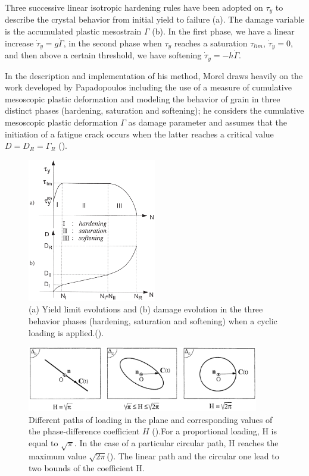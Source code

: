 Three successive linear isotropic hardening rules have
been adopted on $\tau_y$ to describe the crystal behavior from
initial yield to failure (a). The damage variable is the accumulated plastic mesostrain $\Gamma$ (b).
In the first phase, we have a linear increase $\dot{\tau}_y=g\dot{\Gamma}$, in the second phase when $\tau_y$ reaches a saturation $\tau_{lim}$, $\dot{\tau}_y=0$, and then above a certain threshold, we have softening $\dot{\tau}_y=-h\dot{\Gamma}$.

In the description and implementation of his method, Morel draws heavily on the work developed by Papadopoulos including the use of a measure of cumulative mesoscopic plastic deformation   and modeling the behavior of grain in three distinct phases (hardening, saturation and softening); he considers the cumulative mesoscopic plastic deformation $\Gamma$ as damage parameter and assumes that the initiation of a fatigue crack occurs when the latter reaches a
critical value $D = D_R = \Gamma_R$ (). 
\begin{figure}[h!]
	\centering
	\includegraphics[width=0.5\textwidth]{figures//3phases.png} 
	\caption{(a) Yield limit evolutions and (b) damage evolution in the three behavior phases (hardening, saturation and softening) when a cyclic loading is applied.(\cite{Morel2000101}).}
	\label{3phases}
\end{figure}

\begin{figure}[h!]
	\centering
	\includegraphics[width=0.9\textwidth]{figures//H.png} 
	\caption{Different paths of loading in the plane and corresponding values of the phase-difference coefficient $H$ (\cite{Morel2000101}).For a proportional
		loading, H is equal to $\sqrt{\pi}$. In the case of a particular
		circular path, H reaches the maximum value $\sqrt{2\pi}$(). 
		The linear path and the circular one lead to two bounds of
		the coefficient H.}
	\label{figH}
\end{figure}


